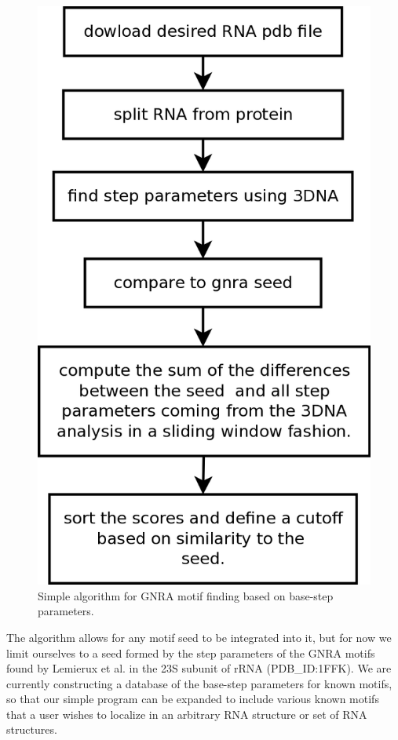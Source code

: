 \begin{figure}[ht]
\centering
\includegraphics[angle=0, scale=0.4]{Chapter5/getMotif.png}
\caption{Simple algorithm  for GNRA motif  finding based on  base-step
  parameters.}
\label{fig:getMotif}
\end{figure}
  
The algorithm allows for any motif  seed to be integrated into it, but
for now we limit ourselves to  a seed formed by the step parameters of
the GNRA  motifs found by  Lemierux et al.  \cite{lemieux2006}  in the
23S subunit  of rRNA (PDB\_ID:1FFK).  We are  currently constructing a
database of  the base-step  parameters for known  motifs, so  that our
simple program can be expanded  to include various known motifs that a
user wishes  to localize in an  arbitrary RNA structure or  set of RNA
structures.

